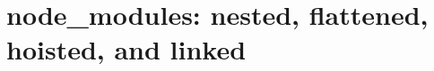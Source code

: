 \chapter{node\_modules: nested, flattened, hoisted, and linked}
\label{ch:node-modules-nested-flattened-hoisted}

